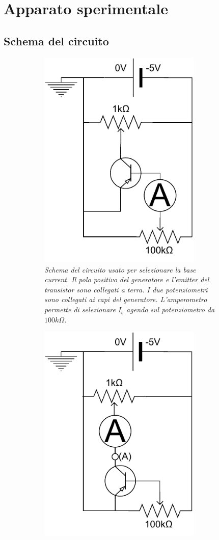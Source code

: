 \section{Apparato sperimentale}\label{sec:apparato-sperimentale}
  \subsection{Schema del circuito}\label{subsec:schema-circuito}
  \begin{figure}%
    \centering
    \begin{subfigure}[t]{.47\textwidth}
      \includegraphics[width=7.75cm]{../assets/circuito-base-current.pdf}
      \caption{
        \emph{
          Schema del circuito usato per selezionare la base current. Il polo positivo del generatore e l'\emph{emitter}
          del transistor sono collegati a terra. I due potenziometri sono collegati ai capi del generatore. L'amperometro
          permette di selezionare $I_b$ agendo sul potenziometro da $100k\Omega$.
        }
      }
      \label{fig:circuito-base-current}
    \end{subfigure}
    \hspace{5mm}
    \begin{subfigure}[t]{.47\textwidth}
      \includegraphics[width=7.75cm]{../assets/circuito.pdf}

\end{subfigure}
\end{figure}
